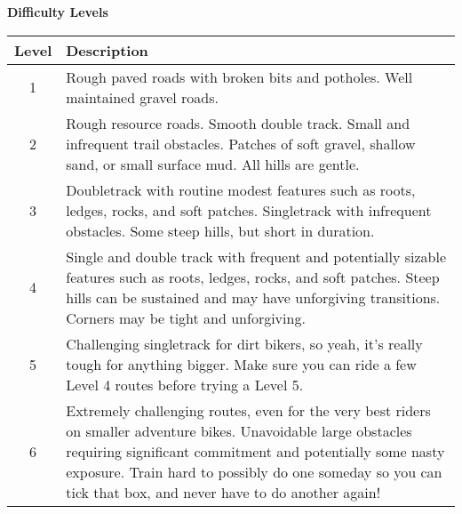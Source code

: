 \documentclass{article}
\begin{document}
\begin{minipage}[t]{0.45\linewidth}
    \textbf{Difficulty Levels}
    
    \vspace{0.5em}
    
    \begin{tabular}{|c|p{11cm}|}
    \hline
    \textbf{Level} & \textbf{Description} \\
    \hline
    1 & Rough paved roads with broken bits and potholes. Well maintained gravel roads. \\
    \hline
    2 & Rough resource roads. Smooth double track. Small and infrequent trail obstacles. Patches of soft gravel, shallow sand, or small surface mud. All hills are gentle. \\
    \hline
    3 & Doubletrack with routine modest features such as roots, ledges, rocks, and soft patches. Singletrack with infrequent obstacles. Some steep hills, but short in duration. \\
    \hline
    4 & Single and double track with frequent and potentially sizable features such as roots, ledges, rocks, and soft patches. Steep hills can be sustained and may have unforgiving transitions. Corners may be tight and unforgiving. \\
    \hline
    \rowcolor{lightgrey}
    5 & Challenging singletrack for dirt bikers, so yeah, it’s really tough for anything bigger. Make sure you can ride a few Level 4 routes before trying a Level 5. \\
    \hline
    \rowcolor{lightgrey}
    6 & Extremely challenging routes, even for the very best riders on smaller adventure bikes. Unavoidable large obstacles requiring significant commitment and potentially some nasty exposure. Train hard to possibly do one someday so you can tick that box, and never have to do another again! \\
    \hline
    \end{tabular}
\end{minipage}
\end{document}
